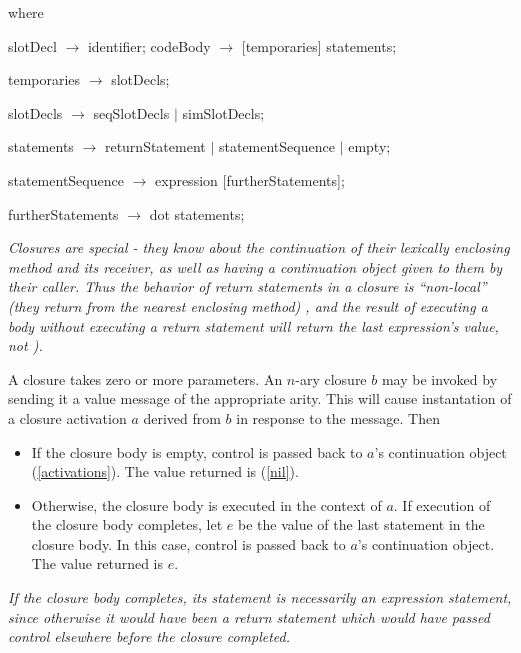 \documentclass{article}
\newcommand{\code}[1]{{\sf #1}}
\begin{document}
where
\begin{newspeak}
slotDecl $\rightarrow$ identifier;    
codeBody $\rightarrow$ [temporaries]  statements;    
  
temporaries $\rightarrow$ slotDecls;
  
slotDecls $\rightarrow$ seqSlotDecls $|$ 
                      simSlotDecls;
  
statements $\rightarrow$ returnStatement  $|$   
                  statementSequence $|$
                  empty;
                         
statementSequence $\rightarrow$ expression [furtherStatements];
  
furtherStatements $\rightarrow$ dot  statements;                          
\end{newspeak}

{\it
Closures are special - they know about the continuation of their lexically enclosing method and its receiver, as well as having a continuation object given to them by their caller. Thus the behavior of return statements in a closure  is ``non-local'' (they return from the nearest enclosing method) ,  and the result of executing a body without executing a return statement  will return the last expression's value, not \SELF).
}

A closure takes zero or more parameters. An $n$-ary closure $b$ may be invoked by sending it a \code{value} message of the appropriate arity. This will cause instantation of a closure activation $a$ derived from $b$ in response to the message. Then
\begin{itemize} 
\item If  the closure body is empty,  control is passed back to $a$'s continuation object (\ref{activations}). The value returned is \NIL{ } (\ref{nil}).
\item Otherwise, the closure body is executed in the context of $a$. If execution of the closure body completes, let $e$ be the value of the last statement in the closure body. In this case, control is passed back to $a$'s continuation object. The value returned is $e$.
\end{itemize}
{\it If the closure  body completes, its statement is necessarily an expression statement, since otherwise it would have been a return statement which would have passed control elsewhere before the closure completed.}
\end{document}
